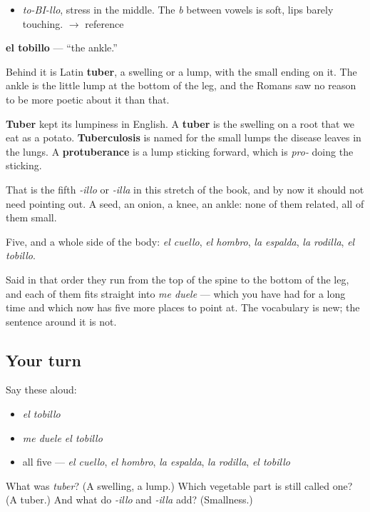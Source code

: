 \begin{sounds}
\begin{itemize}
\raggedright
  \item \emph{to-BI-llo}, stress in the middle. The \emph{b} between vowels is soft, lips barely touching. $\to$ reference
\end{itemize}
\end{sounds}

\begin{cousinweb}
\textbf{el tobillo} — \textquotedblleft{}the ankle.\textquotedblright{}

Behind it is Latin \textbf{tuber}, a swelling or a lump, with the small ending on it. The ankle is the little lump at the bottom of the leg, and the Romans saw no reason to be more poetic about it than that.

\textbf{Tuber} kept its lumpiness in English. A \textbf{tuber} is the swelling on a root that we eat as a potato. \textbf{Tuberculosis} is named for the small lumps the disease leaves in the lungs. A \textbf{protuberance} is a lump sticking forward, which is \emph{pro-} doing the sticking.

That is the fifth \emph{-illo} or \emph{-illa} in this stretch of the book, and by now it should not need pointing out. A seed, an onion, a knee, an ankle: none of them related, all of them small.
\end{cousinweb}

\begin{grammarlens}[title={What you've built}]
Five, and a whole side of the body: \emph{el cuello}, \emph{el hombro}, \emph{la espalda}, \emph{la rodilla}, \emph{el tobillo}.

Said in that order they run from the top of the spine to the bottom of the leg, and each of them fits straight into \emph{me duele} — which you have had for a long time and which now has five more places to point at. The vocabulary is new; the sentence around it is not.
\end{grammarlens}

\subsection*{Your turn}
Say these aloud:

\begin{itemize}
\raggedright
  \item \emph{el tobillo}
  \item \emph{me duele el tobillo}
  \item all five — \emph{el cuello}, \emph{el hombro}, \emph{la espalda}, \emph{la rodilla}, \emph{el tobillo}
\end{itemize}

\begin{tcolorbox}[breakable,colback=teal!4,colframe=teal!35!black,title={Before you move on}]
What was \emph{tuber}? (A swelling, a lump.) Which vegetable part is still called one? (A tuber.) And what do \emph{-illo} and \emph{-illa} add? (Smallness.)
\end{tcolorbox}
